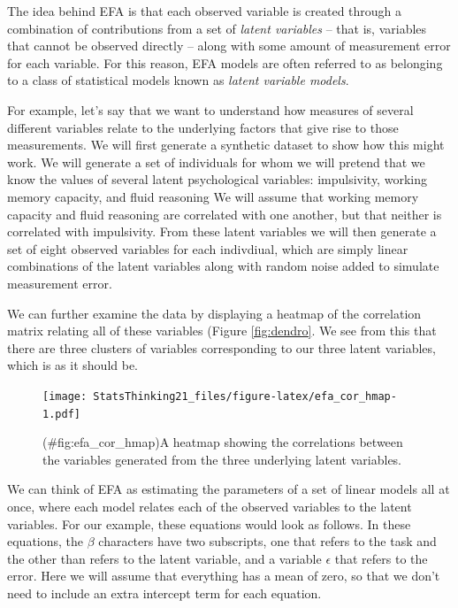 \documentclass[
  12pt,
]{book}
\begin{document}
The idea behind EFA is that each observed variable is created through a combination of contributions from a set of \emph{latent variables} -- that is, variables that cannot be observed directly -- along with some amount of measurement error for each variable. For this reason, EFA models are often referred to as belonging to a class of statistical models known as \emph{latent variable models}.

For example, let's say that we want to understand how measures of several different variables relate to the underlying factors that give rise to those measurements. We will first generate a synthetic dataset to show how this might work. We will generate a set of individuals for whom we will pretend that we know the values of several latent psychological variables: impulsivity, working memory capacity, and fluid reasoning We will assume that working memory capacity and fluid reasoning are correlated with one another, but that neither is correlated with impulsivity. From these latent variables we will then generate a set of eight observed variables for each indivdiual, which are simply linear combinations of the latent variables along with random noise added to simulate measurement error.

We can further examine the data by displaying a heatmap of the correlation matrix relating all of these variables (Figure \ref{fig:dendro}. We see from this that there are three clusters of variables corresponding to our three latent variables, which is as it should be.

\begin{figure}
\centering
\texttt{[image: StatsThinking21\_files/figure-latex/efa\_cor\_hmap-1.pdf]}
\caption{(\#fig:efa\_cor\_hmap)A heatmap showing the correlations between the variables generated from the three underlying latent variables.}
\end{figure}

We can think of EFA as estimating the parameters of a set of linear models all at once, where each model relates each of the observed variables to the latent variables. For our example, these equations would look as follows. In these equations, the \(\beta\) characters have two subscripts, one that refers to the task and the other than refers to the latent variable, and a variable \(\epsilon\) that refers to the error. Here we will assume that everything has a mean of zero, so that we don't need to include an extra intercept term for each equation.
\end{document}
